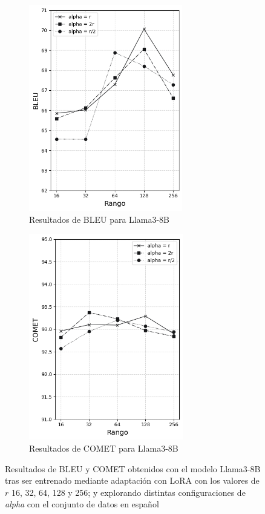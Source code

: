 \documentclass[11pt,spanish,listoffigures,listoftables]{tfgetsinf}
\begin{document}
\begin{figure}[!h]

\begin{subfigure}{0.5\textwidth}
\includegraphics[width=0.9\linewidth, height=9cm]{images/llama_BLEU_} 
\caption{Resultados de BLEU para Llama3-8B}
\label{fig:subim1}
\end{subfigure}
\begin{subfigure}{0.5\textwidth}
\includegraphics[width=0.9\linewidth, height=9cm]{images/llama_COMET_}
\caption{Resultados de COMET para Llama3-8B}
\label{fig:subim2}
\end{subfigure}

\caption{Resultados de BLEU y COMET obtenidos con el modelo Llama3-8B tras ser entrenado mediante adaptación con LoRA con los valores de $r$ 16, 32, 64, 128 y 256;  y explorando distintas configuraciones de \textit{alpha} con el conjunto de datos en español}
\label{fig:graficasLlama}
\end{figure}
\end{document}
